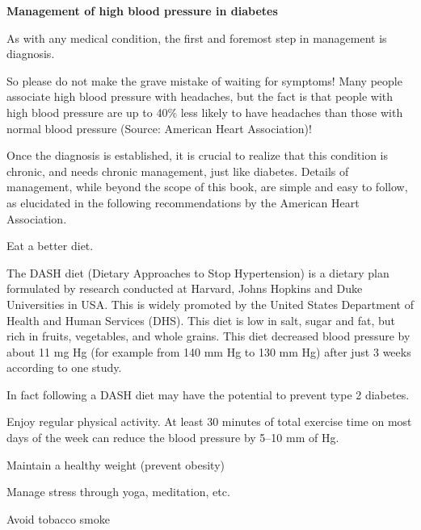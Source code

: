 \textbf{Management of high blood pressure in diabetes}

As with any medical condition, the first and foremost step in management is diagnosis.

 So please do not make the grave mistake of waiting for symptoms! Many people associate high blood pressure with headaches, but the fact is that people with high blood pressure are up to 40\% less likely to have headaches than those with normal blood pressure (Source: American Heart Association)!


Once the diagnosis is established, it is crucial to realize that this condition is chronic, and needs chronic management, just like diabetes. Details of management, while beyond the scope of this book, are simple and easy to follow, as elucidated in the following recommendations by the American Heart Association.

\item 
 Eat a better diet.

 The DASH diet (Dietary Approaches to Stop Hypertension) is a dietary plan formulated by research conducted at Harvard, Johns Hopkins and Duke Universities in USA. This is widely promoted by the United States Department of Health and Human Services (DHS). This diet is low in salt, sugar and fat, but rich in fruits, vegetables, and whole grains. This diet decreased blood pressure by about 11 mg Hg (for example from 140 mm Hg to 130 mm Hg) after just 3 weeks according to one study.\supskpt{\footnote{}}

 In fact following a DASH diet may have the potential to prevent type 2 diabetes.\supskpt{\footnote{}}

 \item Enjoy regular physical activity. At least 30 minutes of total exercise time on most days of the week can reduce the blood pressure by 5–10 mm of Hg.

 \item Maintain a healthy weight (prevent obesity)

 \item Manage stress through yoga, meditation, etc.

 \item Avoid tobacco smoke


